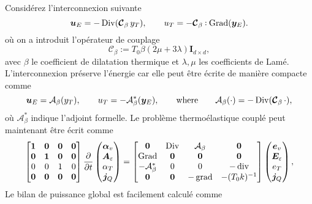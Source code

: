 Considérez l'interconnexion suivante
\begin{equation*}
\bm{u}_E = - \Div(\bm{\mathcal{C}}_\beta \, y_T), \qquad
u_T = - \bm{\mathcal{C}}_\beta \cddot\Grad(\bm{y}_E). 
\end{equation*}
où on a introduit l'opérateur de couplage
\[\bm{\mathcal{C}}_\beta:=T_0 \beta(2\mu + 3 \lambda)\bm{I}_{d\times d}, \]
avec $\beta$ le coefficient de dilatation thermique et $\lambda, \mu$ les coefficients de Lamé. L'interconnexion préserve l'énergie car elle peut être écrite de manière compacte comme
\begin{equation*}
\bm{u}_E = \mathcal{A}_\beta(y_T), \qquad u_T = - \mathcal{A}_\beta^*(\bm{y}_E), \qquad \text{where} \qquad  \mathcal{A}_\beta(\cdot) = - \operatorname*{Div}(\bm{\mathcal{C}}_\beta \, \cdot),
\end{equation*}
où $\mathcal{A}_\beta^*$ indique l'adjoint formelle. Le problème thermoélastique couplé peut maintenant être écrit comme
\begin{equation*}
\begin{bmatrix}
\bm{1} & \bm{0} & \bm{0} & \bm{0}\\
\bm{0} & \bm{1} & \bm{0} & \bm{0}\\
0 & 0 & 1 & 0\\
\bm{0} & \bm{0} & \bm{0} & \bm{0}\\
\end{bmatrix}
\diffp{}{t}
\begin{pmatrix}
\bm{\alpha}_v \\
\bm{A}_\varepsilon \\
{\alpha}_T \\
\bm{j}_Q \\
\end{pmatrix} = 
\begin{bmatrix}
\bm{0} & \Div & \mathcal{A}_\beta & \bm{0}\\
\Grad & \bm{0} & \bm{0} & \bm{0} \\
- \mathcal{A}_\beta^* & 0 & 0 & -\div \\
\bm{0} & \bm{0} & -\grad & - (T_0 k)^{-1} \\
\end{bmatrix}
\begin{pmatrix}
\bm{e}_v \\
\bm{E}_\varepsilon \\
{e}_T \\
\bm{j}_Q \\
\end{pmatrix},
\end{equation*}
Le bilan de puissance global est facilement calculé comme
